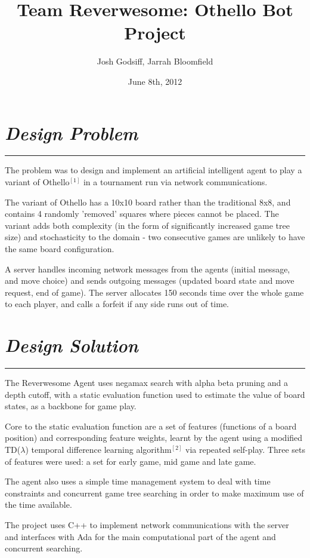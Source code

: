 \documentclass[10pt]{report}
\begin{document}
\date{June 8th, 2012}
\title{Team Reverwesome: Othello Bot Project}
\author{Josh Godsiff, Jarrah Bloomfield}
\maketitle

\setlength{\columnsep}{22.0pt}
\begin{multicols}{2}
\section*{\emph{Design Problem}}
\hrule

The problem was to design and implement an artificial intelligent agent to play a variant of Othello$^{[1]}$ in a tournament run via network communications.

The variant of Othello has a 10x10 board rather than the traditional 8x8, and contains 4 randomly 'removed' squares where pieces cannot be placed. The variant adds both complexity (in the form of significantly increased game tree size) and stochasticity to the domain - two consecutive games are unlikely to have the same board configuration.

A server handles incoming network messages from the agents (initial message, and move choice) and sends outgoing messages (updated board state and move request, end of game). The server allocates 150 seconds time over the whole game to each player, and calls a forfeit if any side runs out of time.
\section*{\emph{Design Solution}}
\hrule

The Reverwesome Agent uses negamax search with alpha beta pruning and a depth cutoff, with a static evaluation function used to estimate the value of board states, as a backbone for game play.

Core to the static evaluation function are a set of features (functions of a board position) and corresponding feature weights, learnt by the agent using a modified TD($\lambda$) temporal difference learning algorithm$^{[2]}$ via repeated self-play. Three sets of features were used: a set for early game, mid game and late game.

The agent also uses a simple time management system to deal with time constraints and concurrent game tree searching in order to make maximum use of the time available.

The project uses C++ to implement network communications with the server and interfaces with Ada for the main computational part of the agent and concurrent searching.

\end{multicols}
\end{document}
